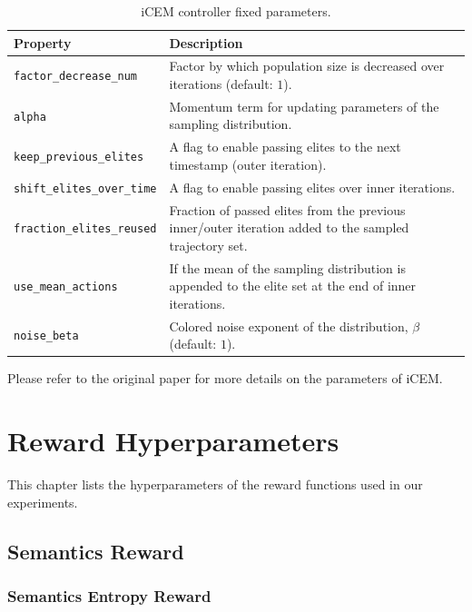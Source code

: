 \begin{table}[H]
    \centering
    \begin{tabularx}{\textwidth}{C{4.7cm} L}
        \hline
        Property & Description\\
        \hline
        \texttt{factor\_decrease\_num} & Factor by which population size is decreased over iterations (default: \(1\)).\\
        \texttt{alpha} & Momentum term for updating parameters of the sampling distribution.\\
        \texttt{keep\_previous\_elites} & A flag to enable passing elites to the next timestamp (outer iteration).\\
        \texttt{shift\_elites\_over\_time} & A flag to enable passing elites over inner iterations.\\
        \texttt{fraction\_elites\_reused} & Fraction of passed elites from the previous inner/outer iteration added to the sampled trajectory set.\\
        \texttt{use\_mean\_actions} & If the mean of the sampling distribution is appended to the elite set at the end of inner iterations.\\
        \texttt{noise\_beta} & Colored noise exponent of the distribution, \(\beta\) (default: \(1\)).\\
        \hline
    \end{tabularx}
    \caption{iCEM controller fixed parameters.}
    \label{tab:icem-params-fixed}
\end{table}

Please refer to the original paper for more details on the parameters of iCEM.


\chapter{Reward Hyperparameters}
\label{sec:reward-details}

This chapter lists the hyperparameters of the reward functions used in our experiments.

\section{Semantics Reward}
\label{sec:semantics-reward-details}

\subsection{Semantics Entropy Reward}
\label{sec:semantics-entropy-reward-details}

